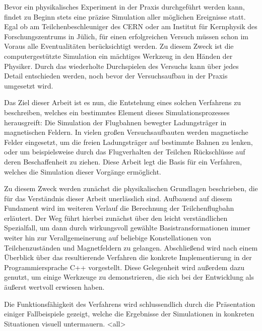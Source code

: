 Bevor ein physikalisches Experiment in der Praxis durchgef\"uhrt werden kann, findet zu Beginn stets eine
pr\"azise Simulation aller m\"oglichen Ereignisse statt. Egal ob am Teilchenbeschleuniger des CERN oder am
Institut f\"ur Kernphysik des Forschungszentrums in J\"ulich, f\"ur einen erfolgreichen Versuch
m\"ussen schon im Voraus alle Eventualit\"aten ber\"ucksichtigt werden. Zu diesem Zweck ist die
computergest\"utzte Simulation ein m\"achtiges Werkzeug in den H\"anden der Physiker. Durch das
wiederholte Durchspielen des Versuchs kann \"uber jedes Detail entschieden werden, noch bevor der
Versuchsaufbau in der Praxis umgesetzt wird.

Das Ziel dieser Arbeit ist es nun, die Entstehung eines
solchen Verfahrens zu beschreiben, welches ein bestimmtes Element dieses Simulationsprozesses
herausgreift: Die Simulation der Flugbahnen bewegter Ladungstr\"ager in magnetischen Feldern.
In vielen gro{\ss}en Versuchsaufbauten werden magnetische
Felder eingesetzt, um die freien Ladungstr\"ager auf bestimmte Bahnen zu lenken, oder um
beispielsweise durch das Flugverhalten der Teilchen R\"uckschl\"usse auf deren Beschaffenheit zu
ziehen. Diese Arbeit legt die Basis f\"ur ein Verfahren, welches die Simulation dieser Vorg\"ange
erm\"oglicht.

Zu diesem Zweck werden zun\"achst die physikalischen Grundlagen beschrieben, die f\"ur das
Verst\"andnis dieser Arbeit unerl\"asslich sind. Aufbauend auf diesem Fundament wird im weiteren
Verlauf die Berechnung der Teilchenflugbahn erl\"autert. Der Weg f\"uhrt hierbei zun\"achst \"uber
den leicht verst\"andlichen Spezialfall, um dann durch wirkungsvoll gew\"ahlte Basistransformationen immer weiter
hin zur Verallgemeinerung auf beliebige Konstellationen von Teilchenzust\"anden und Magnetfeldern zu
gelangen. Abschlie{\ss}end wird nach einem \"Uberblick \"uber das resultierende Verfahren die
konkrete Implementierung in der Programmiersprache C++ vorgestellt. Diese Gelegenheit wird
au{\ss}erdem dazu genutzt, um einige Werkzeuge zu demonstrieren, die sich bei der Entwicklung als
\"au{\ss}erst wertvoll erwiesen haben.

Die Funktionsf\"ahigkeit des Verfahrens wird schlussendlich
durch die Pr\"asentation einiger Fallbeispiele gezeigt, welche die Ergebnisse der Simulationen in
konkreten Situationen visuell untermauern.
\mode<all>
